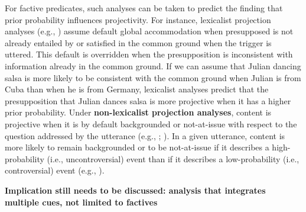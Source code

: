 \documentclass[12pt,fleqn]{article}
\newcommand{\6}{\mbox{$[\hspace*{-.6mm}[$}}
\newcommand{\9}{\mbox{$]\hspace*{-.6mm}]$}}
\begin{document}
For factive predicates, such analyses can be taken to predict the finding that prior probability influences projectivity. For instance, lexicalist projection analyses (e.g., \citealt{heim83,vds92}) assume default global accommodation when presupposed is not already entailed by or satisfied in the common ground when the trigger is uttered. This default is overridden when the presupposition is inconsistent with information already in the common ground. If we can assume that Julian dancing salsa is more likely to be consistent with the common ground when Julian is from Cuba than when he is from Germany, lexicalist analyses predict that the presupposition that Julian dances salsa is more projective when it has a higher prior probability. Under {\bf non-lexicalist projection analyses}, content is projective when it is by default backgrounded or not-at-issue with respect to the question addressed by the utterance (e.g., \citealt{abrusan2011,abrusan2016,brst-salt10,brst-ar}; \citealt*{tbd-variability}). In a given utterance,  content is more likely to remain backgrounded or to be not-at-issue if it describes a high-probability (i.e., uncontroversial) event than if it describes a low-probability (i.e., controversial) event (e.g., \citealt[252]{simons2003}).

{\bf Implication still needs to be discussed: analysis that integrates multiple cues, not limited to factives}
\newpage


\end{document}
